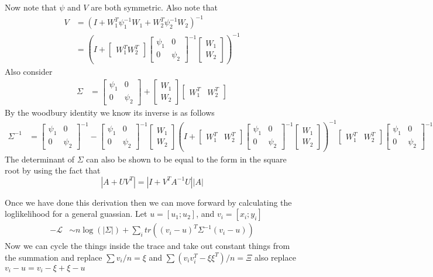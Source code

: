 \documentclass[11pt]{article}
\renewcommand{\det}[1]{|#1|}
\newcommand{\ps}{\begin{bmatrix} \psi_1 & 0 \\ 0 & \psi_2 \end{bmatrix}}
\begin{document}
Now note that $\psi$ and $V$ are both symmetric. Also note that
\begin{align}
  V &= (I+W_1^T\psi_1^{-1}W_1+W_2^T\psi_2^{-1}W_2)^{-1}\\
  &= (I + \begin{bmatrix} W_1^T W_2^T \end{bmatrix} \begin{bmatrix}
    \psi_1 & 0 \\ 0 & \psi_2 \end{bmatrix}^{-1} \begin{bmatrix} W_1
    \\ W_2 \end{bmatrix})^{-1}
\end{align}
Also consider
\begin{align}
  \Sigma &= \begin{bmatrix} \psi_1 & 0 \\ 0 &
    \psi_2 \end{bmatrix} + \begin{bmatrix} W_1 \\ W_2 \end{bmatrix}  \begin{bmatrix} W_1^T & W_2^T \end{bmatrix}
\end{align}
By the woodbury identity we know its inverse is as follows
\begin{align}
  \Sigma^{-1} &= \ps^{-1} - \ps^{-1}\begin{bmatrix} W_1
    \\ W_2 \end{bmatrix}(I+ \begin{bmatrix} W_1^T &
    W_2^T \end{bmatrix} \ps^{-1} \begin{bmatrix} W_1
    \\ W_2 \end{bmatrix})^{-1} \begin{bmatrix} W_1^T &
    W_2^T \end{bmatrix} \ps^{-1}
\end{align}
The determinant of $\Sigma$ can also be shown to be equal to the form
in the square root by using the fact that $$\det{A+UV^T} = \det{I+V^TA^{-1}U}\det{A}$$

Once we have done this derivation then we can move forward by
calculating the loglikelihood for a general guassian.
Let $u = [u_1; u_2]$, and $v_i = [x_i; y_i]$
\begin{align}
  \mathcal{-L}  &\sim n\log(\det{\Sigma}) + \sum_i tr((v_i-u)^T\Sigma^{-1}(v_i-u))
\end{align}
Now we can cycle the things inside the trace and take out constant
things from the summation and replace $\sum v_i/n = \xi$ and $\sum
(v_iv_i^T - \xi \xi^T)/n = \Xi$ also replace $v_i - u = v_i - \xi +
\xi - u$
\end{document}
